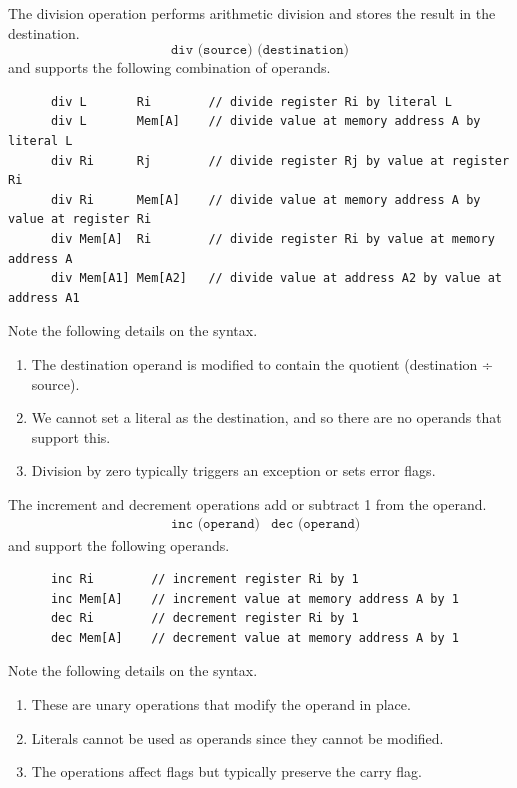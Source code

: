   \begin{definition}[Division]
    The division operation performs arithmetic division and stores the result in the destination.
    \begin{equation}
      \texttt{div (source) (destination)}
    \end{equation}
    and supports the following combination of operands.
    \begin{lstlisting}
      div L       Ri        // divide register Ri by literal L
      div L       Mem[A]    // divide value at memory address A by literal L
      div Ri      Rj        // divide register Rj by value at register Ri
      div Ri      Mem[A]    // divide value at memory address A by value at register Ri
      div Mem[A]  Ri        // divide register Ri by value at memory address A
      div Mem[A1] Mem[A2]   // divide value at address A2 by value at address A1
    \end{lstlisting}
    Note the following details on the syntax.
    \begin{enumerate}
      \item The destination operand is modified to contain the quotient (destination ÷ source).
      \item We cannot set a literal as the destination, and so there are no operands that support this.
      \item Division by zero typically triggers an exception or sets error flags.
    \end{enumerate}
  \end{definition}

  \begin{definition}
    The increment and decrement operations add or subtract 1 from the operand.
    \begin{align*}
      & \texttt{inc (operand)} 
      & \texttt{dec (operand)}
    \end{align*}
    and support the following operands.
    \begin{lstlisting}
      inc Ri        // increment register Ri by 1
      inc Mem[A]    // increment value at memory address A by 1
      dec Ri        // decrement register Ri by 1
      dec Mem[A]    // decrement value at memory address A by 1
    \end{lstlisting}
    Note the following details on the syntax.
    \begin{enumerate}
      \item These are unary operations that modify the operand in place.
      \item Literals cannot be used as operands since they cannot be modified.
      \item The operations affect flags but typically preserve the carry flag.
    \end{enumerate}
  \end{definition}

